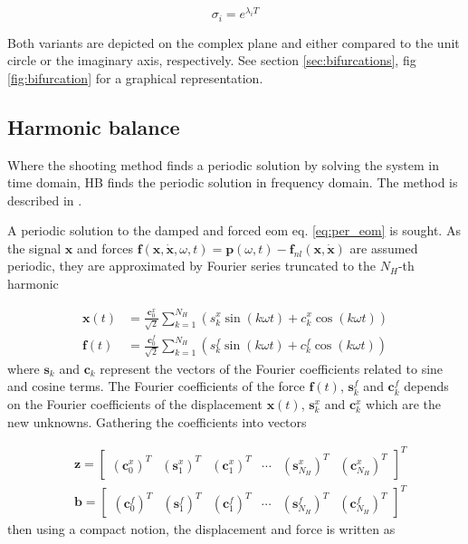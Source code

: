 \begin{equation}
  \label{eq:floquet_relations}
  \sigma_i = e^{\lambda_i T}
\end{equation}

Both variants are depicted on the complex plane and either compared to the unit
circle or the imaginary axis, respectively. See section \ref{sec:bifurcations},
fig \ref{fig:bifurcation} for a graphical representation.

\subsection{Harmonic balance}
\label{sec:harmonic_bal}

Where the shooting method finds a periodic solution by solving the system in
time domain, HB finds the periodic solution in frequency domain. The method is
described in \textcite{detroux2016a}.

A periodic solution to the damped and forced eom eq. \eqref{eq:per_eom} is
sought.
As the signal $\bm x$ and forces $\bm f(\bm x, \dot{\bm x}, \omega ,t) = \bm
p(\omega, t)- \bm f_{nl}(\bm x, \dot{\bm x})$ are assumed periodic, they are
approximated by Fourier series truncated to the $N_H$-th harmonic

\begin{align}
  \label{eq:hb_x_expansion}
  \bm x(t) &= \frac{\bm c^x_0}{\sqrt{2}} \sum_{k=1}^{N_H} (s^x_k \sin(k\omega t) +
          c^x_k \cos(k\omega t)) \\
  \label{eq:hb_f_expansion}
  \bm f(t) &= \frac{\bm c^f_0}{\sqrt{2}} \sum_{k=1}^{N_H} (s^f_k \sin(k\omega t) +
          c^f_k \cos(k\omega t))
\end{align}
where $\bm s_k$ and $\bm c_k$ represent the vectors of the Fourier coefficients
related to sine and cosine terms. The Fourier coefficients of the force $\bm f(t)$,
$\bm s^f_k$ and $\bm c^f_k$ depends on the Fourier coefficients of the
displacement $\bm x(t)$, $\bm s^x_k$ and $\bm c^x_k$ which are the new unknowns.
Gathering the coefficients into vectors

\begin{align}
  \label{eq:hb_coeffz}
  &\bm z =
    \begin{bmatrix}
      (\bm c^x_0)^T & (\bm s^x_1)^T & (\bm c^x_1)^T & \cdots &
      (\bm s^x_{N_H})^T & (\bm c^x_{N_H})^T
    \end{bmatrix}^T \\
  \label{eq:hb_coeffz}
  &\bm b =
    \begin{bmatrix}
      (\bm c^f_0)^T & (\bm s^f_1)^T & (\bm c^f_1)^T & \cdots &
      (\bm s^f_{N_H})^T & (\bm c^f_{N_H})^T
    \end{bmatrix}^T
\end{align}
then using a compact notion, the displacement and force is written as

